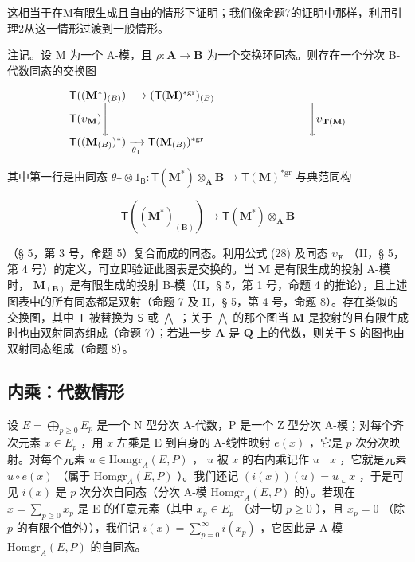 这相当于在M有限生成且自由的情形下证明；我们像命题7的证明中那样，利用引理2从这一情形过渡到一般情形。

注记。设 M 为一个 A-模，且 \(\rho: \mathbf{A} \to \mathbf{B}\) 为一个交换环同态。则存在一个分次 B-代数同态的交换图

\[
\begin{array}{l} \mathsf {T} ((\mathbf {M} ^ {*}) _ {(B)}) \longrightarrow (\mathsf {T} (\mathbf {M}) ^ {* \mathrm{gr}}) _ {(B)} \\ \mathsf {T} (\upsilon_ {\mathbf {M}}) \Biggl \downarrow \qquad \qquad \qquad \qquad \qquad \qquad \qquad \qquad \qquad \Biggl \downarrow \upsilon_ {\mathbf {T} (\mathbf {M})} \\ \mathsf {T} ((\mathbf {M} _ {(B)}) ^ {*}) \xrightarrow [ \theta_ {\mathsf {T}} ]{} \mathsf {T} (\mathbf {M} _ {(B)}) ^ {* \mathrm{gr}} \end{array}
\]

其中第一行是由同态 \(\theta_{\mathsf{T}}\otimes 1_{\mathsf{B}}\colon \mathsf{T}(\mathbf{M}^{*})\otimes_{\mathbf{A}}\mathbf{B}\to \mathsf{T}(\mathbf{M})^{*\mathrm{gr}}\) 与典范同构

\[
\mathsf {T} ((\mathbf {M} ^ {*}) _ {(\mathbf {B})}) \rightarrow \mathsf {T} (\mathbf {M} ^ {*}) \otimes_ {\mathbf {A}} \mathbf {B}
\]

（§ 5，第 3 号，命题 5）复合而成的同态。利用公式 (28) 及同态 \(\upsilon_{\mathbf{E}}\) （II，§ 5，第 4 号）的定义，可立即验证此图表是交换的。当 \(\mathbf{M}\) 是有限生成的投射 A-模时， \(\mathbf{M}_{(\mathbf{B})}\) 是有限生成的投射 B-模（II，§ 5，第 1 号，命题 4 的推论），且上述图表中的所有同态都是双射（命题 7 及 II，§ 5，第 4 号，命题 8）。存在类似的交换图，其中 \(\mathsf{T}\) 被替换为 \(\mathsf{S}\) 或 \(\bigwedge\) ；关于 \(\bigwedge\) 的那个图当 \(\mathbf{M}\) 是投射的且有限生成时也由双射同态组成（命题 7）；若进一步 \(\mathbf{A}\) 是 \(\mathbf{Q}\) 上的代数，则关于 \(\mathsf{S}\) 的图也由双射同态组成（命题 8）。

\subsection{内乘：代数情形}

设 \(E = \bigoplus_{p \geqslant 0} E_p\) 是一个 N 型分次 A-代数，P 是一个 Z 型分次 A-模；对每个齐次元素 \(x \in E_p\) ，用 \(x\) 左乘是 E 到自身的 A-线性映射 \(e(x)\) ，它是 \(p\) 次分次映射。对每个元素 \(u \in \text{Homgr}_A(E, P)\) ， \(u\) 被 \(x\) 的右内乘记作 \(u \llcorner x\) ，它就是元素 \(u \circ e(x)\) （属于 \(\text{Homgr}_A(E, P)\) ）。我们还记 \((i(x))(u) = u \llcorner x\) ，于是可见 \(i(x)\) 是 \(p\) 次分次自同态（分次 A-模 \(\text{Homgr}_A(E, P)\) 的）。若现在 \(x = \sum_{p \geqslant 0} x_p\) 是 E 的任意元素（其中 \(x_p \in E_p\) （对一切 \(p \geqslant 0\) ），且 \(x_p = 0\) （除 \(p\) 的有限个值外）），我们记 \(i(x) = \sum_{p=0}^{\infty} i(x_p)\) ，它因此是 A-模 \(\text{Homgr}_A(E, P)\) 的自同态。

